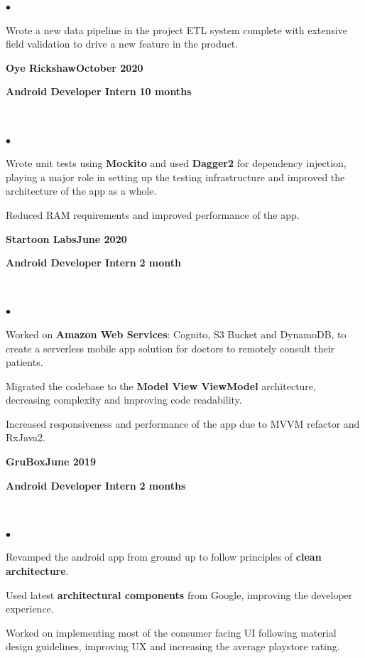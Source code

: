 \documentclass[10pt,a4paper]{extarticle}
\newcommand{\myExperience}[5][ ]{
\textbf{#2}\hfill{\color{resumeGreenLight}\textbf{#1}}\\
\begin{small}{
		\color{resumeBlueDark}
		\textbf{#3}
	}
	\hfill%
	{
		\color{gray}\textbf{#4}%
	}
\end{small}
\vspace{2mm}
\\{#5}
}
\begin{document}
\begin{minipage}{0.4\textwidth}
{\begin{list}{\color{resumeBlueLight}$\bullet$}{\leftmargin 3mm}
			\item{Wrote a new data pipeline in the project ETL system complete with extensive field validation to drive a new feature in the product.}
		\end{list}
	}
	\myExperience[October 2020]{Oye Rickshaw}{Android Developer Intern}{10 months}
	{ %
		\vspace{-8mm}
		\begin{list}{\color{resumeBlueLight}$\bullet$}{\leftmargin 3mm}
			\item{Wrote unit tests using \textbf{Mockito} and used \textbf{Dagger2} for dependency injection, playing a major role in setting up the testing infrastructure and improved the architecture of the app as a whole.}
			\vspace{-2mm}
			\item{Reduced RAM requirements and improved performance of the app.}
		\end{list}
	}
	\myExperience[June 2020]{Startoon Labs}{Android Developer Intern}{2 month}
	{ %
		\vspace{-8mm}
		\begin{list}{\color{resumeBlueLight}$\bullet$}{\leftmargin 3mm}
			\item{Worked on \textbf{Amazon Web Services}: Cognito, S3 Bucket and DynamoDB, to create a serverless mobile app solution for doctors to remotely consult their patients.}
			\vspace{-2mm}
			\item{Migrated the codebase to the \textbf{Model View ViewModel} architecture, decreasing complexity and improving code readability.}
			\vspace{-2mm}
			\item{Increased responsiveness and performance of the app due to MVVM refactor and RxJava2.}
		\end{list}
	}
	\myExperience[June 2019]{GruBox}{Android Developer Intern}{2 months}
	{ %
		\vspace{-8mm}
		\begin{list}{\color{resumeBlueLight}$\bullet$}{\leftmargin 3mm}
			\item{Revamped the android app from ground up to follow principles of \textbf{clean architecture}.}
			\vspace{-2mm}
			\item{Used latest \textbf{architectural components} from Google, improving the developer experience.}
			\vspace{-2mm}
			\item{Worked on implementing most of the consumer facing UI following material design guidelines, improving UX and increasing the average playstore rating.}

\end{list}}
\end{minipage}
\end{document}

